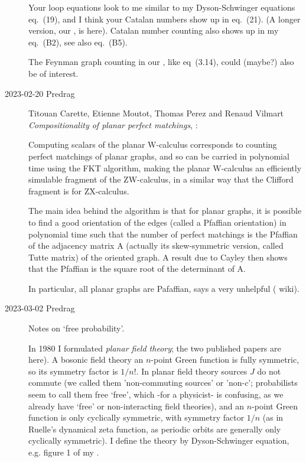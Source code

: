 \begin{description}
Your loop equations look to me similar to my 
Dyson-Schwinger equations
 {eq.~(19)},
and I think your Catalan numbers show up in eq.~(21).
(A longer version, our , is
 {here}).
Catalan number counting also shows up in my 
 {eq.~(B2)},
see also eq.~(B5).

The Feynman graph counting in our , like
 {eq~(3.14)},
could (maybe?) also be of interest.

   \item[2023-02-20 Predrag]
Titouan Carette, Etienne Moutot, Thomas Perez and Renaud Vilmart
{\em Compositionality of planar perfect matchings},
:

Computing scalars of the planar W-calculus corresponds to counting perfect
matchings of planar graphs, and so can be carried in polynomial time using
the FKT algorithm, making the planar W-calculus an efficiently simulable
fragment of the ZW-calculus, in a similar way that the Clifford fragment is
for ZX-calculus.

The main idea behind the algorithm is that for planar graphs, it is possible
to find a good orientation of the edges (called a Pfaffian orientation) in
polynomial time such that the number of perfect matchings is the Pfaffian of
the adjacency matrix A (actually its skew-symmetric version, called Tutte
matrix) of the oriented graph. A result due to Cayley then shows that the
Pfaffian is the square root of the determinant of A.

In particular, all planar graphs are Pafaffian, says a very unhelpful
( {wiki}).

   \item[2023-03-02 Predrag]
Notes on `free probability'.

In 1980 I formulated {\em planar field theory};
the two published papers are
 {here}).
A bosonic field theory an $n$-point Green function is fully symmetric, so its
symmetry factor is $1/n!$.
In planar field theory sources $J$ do not commute (we called them
'non-commuting sources' or 'non-$c$'; probabilists seem to call them free `free',
which -for a physicist- is confusing, as we already have `free' or
non-interacting field theories), and an
$n$-point Green function is only cyclically symmetric, with symmetry factor
$1/n$ (as in Ruelle's dynamical zeta function, as periodic orbits
are generally only cyclically symmetric). I define the theory by Dyson-Schwinger
equation, e.g. figure 1 of my
.


\end{description}

